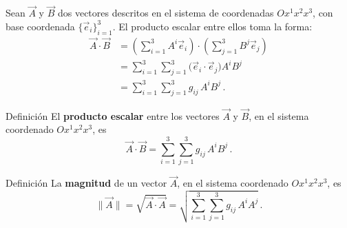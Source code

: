 \documentclass[../apunte_mecanica_clasica.tex]{subfiles}%
\begin{document}
\clearpage

Sean $\vec{A}$ y $\vec{B}$ dos vectores descritos en el sistema de 
coordenadas $Ox^1x^2x^3$, con base coordenada 
$\{\vec{e}_i\}_{i=1}^3$. El producto escalar entre ellos toma la forma:
\begin{align*}
    \vec{A} \cdot \vec{B} 
        &= \left( \sum_{i=1}^3 A^i \vec{e}_i \right) 
           \cdot 
           \left( \sum_{j=1}^3 B^j \vec{e}_j \right) \\[4pt]
        &= \sum_{i=1}^3 \sum_{j=1}^3 
           \big( \vec{e}_i \cdot \vec{e}_j \big) A^i B^j \\[4pt]
        &= \sum_{i=1}^3 \sum_{j=1}^3 g_{ij} \, A^i B^j \,.
\end{align*}

\begin{apuntebloque}{Definición}
El \textbf{producto escalar} entre los vectores $\vec{A}$ y $\vec{B}$, 
en el sistema coordenado $Ox^1x^2x^3$, es
\begin{equation*}
    \vec{A} \cdot \vec{B} 
    = \sum_{i=1}^3 \sum_{j=1}^3 g_{ij}\,A^i B^j \,.
\end{equation*}
\end{apuntebloque}

\begin{apuntebloque}{Definición}
La \textbf{magnitud} de un vector $\vec{A}$, en el sistema coordenado 
$Ox^1x^2x^3$, es
\begin{equation*}
    \|\vec{A}\| = \sqrt{\vec{A} \cdot \vec{A}}
    = \sqrt{\sum_{i=1}^3 \sum_{j=1}^3 g_{ij}\,A^i A^j} \,.
\end{equation*}
\end{apuntebloque}
\end{document}
